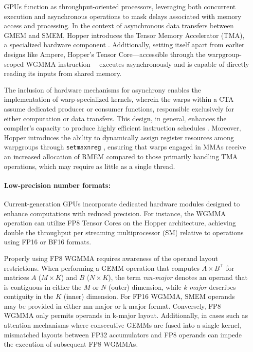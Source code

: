 GPUs function as throughput-oriented processors, leveraging both concurrent execution and asynchronous operations to mask delays associated with memory access and processing. In the context of asynchronous data transfers between GMEM and SMEM, Hopper introduces the Tensor Memory Accelerator (TMA), a specialized hardware component \cite[\S7.29]{cuda}. Additionally, setting itself apart from earlier designs like Ampere, Hopper’s Tensor Core—accessible through the warpgroup-scoped WGMMA instruction \cite[\S9.7.14]{ptx}—executes asynchronously and is capable of directly reading its inputs from shared memory.

The inclusion of hardware mechanisms for asynchrony enables the implementation of warp-specialized kernels, wherein the warps within a CTA assume dedicated producer or consumer functions, responsible exclusively for either computation or data transfers. This design, in general, enhances the compiler’s capacity to produce highly efficient instruction schedules \citep{warp-specialization-2011}. Moreover, Hopper introduces the ability to dynamically assign register resources among warpgroups through \verb|setmaxnreg| \cite[\S9.7.17.1]{ptx}, ensuring that warps engaged in MMAs receive an increased allocation of RMEM compared to those primarily handling TMA operations, which may require as little as a single thread.

\paragraph{Low-precision number formats:}
\label{sec:low-precision-gpu}
Current-generation GPUs incorporate dedicated hardware modules designed to enhance computations with reduced precision. For instance, the WGMMA operation can utilize FP8 Tensor Cores on the Hopper architecture, achieving double the throughput per streaming multiprocessor (SM) relative to operations using FP16 or BF16 formats.

Properly using FP8 WGMMA requires awareness of the operand layout restrictions. When performing a GEMM operation that computes $A \times B^{\top}$ for matrices $A$ ($M\times K$) and $B$ ($N\times K$), the term \emph{mn-major} denotes an operand that is contiguous in either the $M$ or $N$ (outer) dimension, while \emph{k-major} describes contiguity in the $K$ (inner) dimension. For FP16 WGMMA, SMEM operands may be provided in either mn-major or k-major format. Conversely, FP8 WGMMA only permits operands in k-major layout. Additionally, in cases such as attention mechanisms where consecutive GEMMs are fused into a single kernel, mismatched layouts between FP32 accumulators and FP8 operands can impede the execution of subsequent FP8 WGMMAs.

